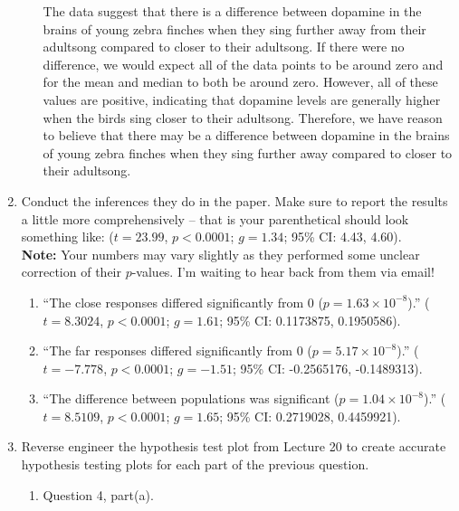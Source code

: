 \documentclass{article}\usepackage[]{graphicx}\usepackage[]{xcolor}
\newenvironment{knitrout}{}{} %
\begin{document}
\begin{enumerate}
\begin{enumerate}
The data suggest that there is a difference between dopamine in the brains of young zebra finches when they sing further away from their adultsong compared to closer to their adultsong. If there were no difference, we would expect all of the data points to be around zero and for the mean and median to both be around zero. However, all of these values are positive, indicating that dopamine levels are generally higher when the birds sing closer to their adultsong. Therefore, we have reason to believe that there may be a difference between dopamine in the brains of young zebra finches when they sing further away compared to closer to their adultsong.
\end{enumerate}
\item Conduct the inferences they do in the paper. Make sure to report the results
a little more comprehensively -- that is your parenthetical should look something
like: ($t=23.99$, $p<0.0001$; $g=1.34$; 95\% CI: 4.43, 4.60).\\
\textbf{Note:} Your numbers may vary slightly as they performed some unclear
correction of their $p$-values. I'm waiting to hear back from them via email!
\begin{enumerate}
  \item ``The close responses differed significantly from 0 ($p=1.63 \times 10^{-8}$).''
\newline ($t=8.3024$, $p<0.0001$; $g=1.61$; 95\% CI: 0.1173875, 0.1950586).
  \item ``The far responses differed significantly from 0 ($p=5.17 \times 10^{-8}$).''
\newline ($t=-7.778$, $p<0.0001$; $g=-1.51$; 95\% CI: -0.2565176, -0.1489313).
  \item ``The difference between populations was significant ($p=1.04 \times10^{-8}$).''
\newline ($t=8.5109$, $p<0.0001$; $g=1.65$; 95\% CI: 0.2719028, 0.4459921).
\end{enumerate}
\newpage
\item Reverse engineer the hypothesis test plot from Lecture 20 to create accurate
hypothesis testing plots for each part of the previous question.
\begin{enumerate}
  \item Question 4, part(a).
\begin{knitrout}
\color{fgcolor}


\end{knitrout}
\end{enumerate}
\end{enumerate}
\end{document}
